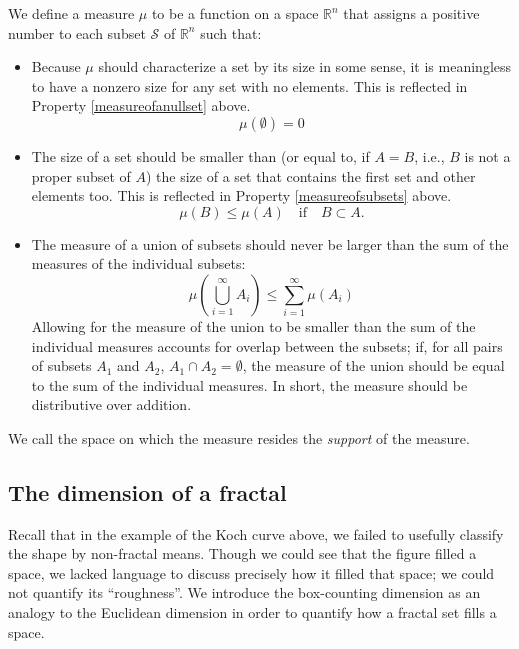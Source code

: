 \begin{mydef}
We define a measure $ \mu $ to be a function on a space $ \mathbb{R}^{n} $ that assigns a positive number to each subset $ \mathcal{S} $ of $ \mathbb{R}^{n} $ such that:

\begin{itemize}
\item Because $\mu$ should characterize a set by its size in some sense, it is meaningless to have a nonzero size for any set with no elements. This is reflected in Property \ref{measureofanullset} above.
\begin{equation}
\mu(\emptyset) = 0
\end{equation}
\item The size of a set should be smaller than (or equal to, if $ A = B $, i.e., $B$ is not a proper subset of $A$) the size of a set that contains the first set and other elements too. This is reflected in Property \ref{measureofsubsets} above.
\begin{equation}
\mu(B) \le \mu(A) \mathrm{ \quad if \quad }  B \subset A.
\end{equation} 
\item The measure of a union of subsets should never be larger than the sum of the measures of the individual subsets: 
\begin{equation}
\mu\left(\bigcup_{i=1}^{\infty} A_i\right) \le \sum_{i=1}^{\infty} \mu(A_i) 
\end{equation}
Allowing for the measure of the union to be smaller than the sum of the individual measures accounts for overlap between the subsets; if, for all pairs of subsets $A_1$ and $A_2$, $A_1 \cap A_2 = \emptyset$, the measure of the union should be equal to the sum of the individual measures. In short, the measure should be distributive over addition.
\end{itemize}
We call the space on which the measure resides the \textit{support} of the measure.
\end{mydef}

\subsection{The dimension of a fractal}
Recall that in the example of the Koch curve above, we failed to usefully classify the shape by non-fractal means. Though we could see that the figure filled a space, we lacked language to discuss precisely how it filled that space; we could not quantify its ``roughness''. We introduce the box-counting dimension as an analogy to the Euclidean dimension in order to quantify how a fractal set fills a space.

